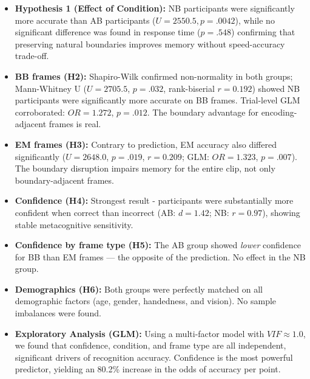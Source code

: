 \documentclass[11pt]{article}
\begin{document}
\begin{itemize}
    \item \textbf{Hypothesis 1 (Effect of Condition):} NB participants were significantly more accurate than AB participants ($U=2550.5, p=.0042$), while no significant difference was found in response time ($p=.548$) confirming that preserving natural boundaries improves memory without speed-accuracy trade-off.
    \item \textbf{BB frames (H2):} Shapiro-Wilk confirmed non-normality in both groups; Mann-Whitney U ($U = 2705.5$, $p = .032$, rank-biserial $r = 0.192$) showed NB participants were significantly more accurate on BB frames. Trial-level GLM corroborated: $OR = 1.272$, $p = .012$. The boundary advantage for encoding-adjacent frames is real.
    \item \textbf{EM frames (H3):} Contrary to prediction, EM accuracy also differed significantly ($U = 2648.0$, $p = .019$, $r = 0.209$; GLM: $OR = 1.323$, $p = .007$). The boundary disruption impairs memory for the entire clip, not only boundary-adjacent frames.
    \item \textbf{Confidence (H4):} Strongest result - participants were substantially more confident when correct than incorrect (AB: $d = 1.42$; NB: $r = 0.97$), showing stable metacognitive sensitivity.
    \item \textbf{Confidence by frame type (H5):} The AB group showed \textit{lower} confidence for BB than EM frames --- the opposite of the prediction. No effect in the NB group.
    \item \textbf{Demographics (H6):} Both groups were perfectly matched on all demographic factors (age, gender, handedness, and vision). No sample imbalances were found.
    \item \textbf{Exploratory Analysis (GLM):} Using a multi-factor model with $VIF \approx 1.0$, we found that confidence, condition, and frame type are all independent, significant drivers of recognition accuracy. Confidence is the most powerful predictor, yielding an 80.2\% increase in the odds of accuracy per point.
\end{itemize}
\end{document}
